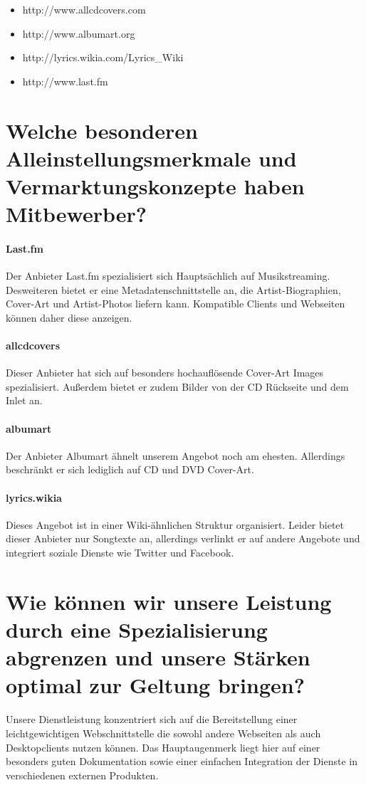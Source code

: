\documentclass[11pt]{scrreprt}
\begin{document}
\begin{itemize}
    \item http://www.allcdcovers.com
    \item http://www.albumart.org
    \item http://lyrics.wikia.com/Lyrics\_Wiki
    \item http://www.last.fm
\end{itemize}


\section{Welche besonderen Alleinstellungsmerkmale und
Vermarktungskonzepte haben Mitbewerber?}

\paragraph{Last.fm}
Der Anbieter Last.fm spezialisiert sich Hauptsächlich auf Musikstreaming.
Desweiteren bietet er eine Metadatenschnittstelle an, die Artist-Biographien,
Cover-Art und Artist-Photos liefern kann. Kompatible Clients und Webseiten können
daher diese anzeigen.

\paragraph{allcdcovers}
Dieser Anbieter hat sich auf besonders hochauflösende Cover-Art Images
spezialisiert. Außerdem bietet er zudem Bilder von der CD Rückseite und dem
Inlet an.

\paragraph{albumart}
Der Anbieter Albumart ähnelt unserem Angebot noch am ehesten. Allerdings
beschränkt er sich lediglich auf CD und DVD Cover-Art.

\paragraph{lyrics.wikia}
Dieses Angebot ist in einer Wiki-ähnlichen Struktur organisiert. Leider bietet
dieser Anbieter nur Songtexte an, allerdings verlinkt er auf andere Angebote und
integriert soziale Dienste wie Twitter und Facebook.

\section{Wie können wir unsere Leistung durch eine
    Spezialisierung abgrenzen und unsere Stärken
optimal zur Geltung bringen?}
Unsere Dienstleistung konzentriert sich auf die Bereitstellung einer
leichtgewichtigen Webschnittstelle die sowohl andere Webseiten als auch
Desktopclients nutzen können. Das Hauptaugenmerk liegt hier auf einer besonders
guten Dokumentation sowie einer einfachen Integration der Dienste in
verschiedenen externen Produkten.
\end{document}

